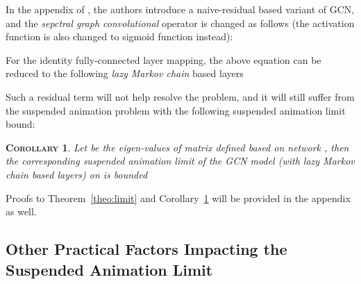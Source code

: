 \documentclass{article}
\newtheorem{corollary}{\textsc{Corollary}}
\newcommand{\gcn}{\textsc{GCN}}
\begin{document}
In the appendix of \cite{KW16}, the authors introduce a naive-residual based variant of {\gcn}, and the \textit{sepctral graph convolutional} operator is changed as follows (the activation function is also changed to sigmoid function instead):


For the identity fully-connected layer mapping, the above equation can be reduced to the following \textit{lazy Markov chain} based layers

Such a residual term will not help resolve the problem, and it will still suffer from the suspended animation problem with the following suspended animation limit bound:

\begin{corollary}\label{coro:limit}
Let  be the eigen-values of matrix  defined based on network , then the corresponding \textit{suspended animation limit} of the {\gcn} model (with \textit{lazy Markov chain} based layers) on  is bounded

\end{corollary}

Proofs to Theorem~\ref{theo:limit} and Corollary~\ref{coro:limit} will be provided in the appendix as well.

\vspace{-8pt}
\subsection{Other Practical Factors Impacting the Suspended Animation Limit}
\vspace{-8pt}
\end{document}
